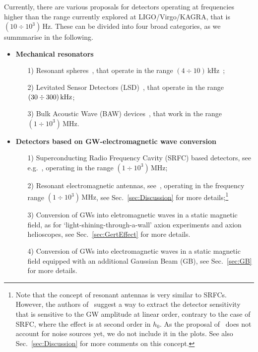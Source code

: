 \documentclass[11pt,a4paper]{article}
\begin{document}
Currently, there are various proposals for detectors operating at frequencies higher than the range currently explored at LIGO/Virgo/KAGRA, that is $(10 \div 10^3) \, \text{Hz}$. These can be divided into four broad categories, as we summmarise in the following.
%
\begin{itemize}[leftmargin=*]
\item {\bf Mechanical resonators}
%
\begin{itemize}[leftmargin=*]
\item[1)] Resonant spheres~\cite{Aguiar:2010kn}, that operate in the range $(4 \div 10) \, \text{kHz}$~\cite{Harry:1996gh};
\item[2)] Levitated Sensor Detectors (LSD)~\cite{Arvanitaki:2012cn, Aggarwal:2020umq}, that operate in the range $(30 \div 300) \, {\rm kHz}$;
\item[3)] Bulk Acoustic Wave (BAW) devices~\cite{Goryachev:2014yra, Page:2020zbr, Goryachev:2021zzn}, that work in the range $(1 \div 10^3) \, \text{MHz}$.
\end{itemize}
%
\item {\bf Detectors based on GW-electromagnetic wave conversion}
%
\begin{itemize}[leftmargin=*]
\item[1)] Superconducting Radio Frequency Cavity (SRFC) based detectors, see e.g.~\cite{Berlin:2021txa, Berlin:2022hfx}, operating in the range $(1 \div 10^3) \, \text{MHz}$;
\item[2)] Resonant electromagnetic antennas, see~\cite{Herman:2020wao, Herman:2022fau}, operating in the frequency range $(1 \div 10^3) \, \text{MHz}$, see Sec.~\ref{sec:Discussion} for more details;\footnote{Note that the concept of resonant antennas is very similar to SRFCs. However, the authors of~\cite{Herman:2020wao, Herman:2022fau} suggest a way to extract the detector sensitivity that is sensitive to the GW amplitude at linear order, contrary to the case of SRFC, where the effect is at second order in $h_0$. As the proposal of~\cite{Herman:2020wao, Herman:2022fau} does not account for noise sources yet, we do not include it in the plots. See also Sec.~\ref{sec:Discussion} for more comments on this concept.}
\item[3)] Conversion of GWs into eletromagnetic waves in a static magnetic field, as for ‘light-shining-through-a-wall’ axion experiments and axion helioscopes, see Sec.~\ref{sec:GertEffect} for more details.
\item[4)] 
Conversion of GWs into electromagnetic waves in a static magnetic field equipped with an additional Gaussian Beam (GB), see Sec.~\ref{sec:GB} for more details.

\end{itemize}
\end{itemize}
\end{document}
